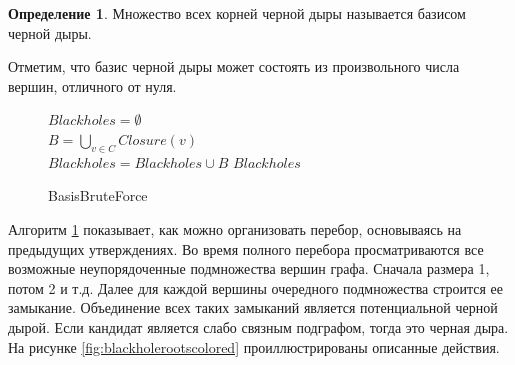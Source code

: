 \documentclass[12pt,a4paper,oneside,openany]{article}
\theoremstyle{definition}
\newtheorem{definition}{Определение}[]
\theoremstyle{lemma}
\theoremstyle{remark}
\begin{document}
\begin{definition}\label{def:blackholebasis}
Множество всех корней черной дыры называется базисом черной дыры.
\end{definition}

Отметим, что базис черной дыры может состоять из произвольного числа вершин, отличного от нуля.

\linespread{1.0}
\begin{figure}[H]
	\begin{center}
		\begin{algorithm}[H]
			\SetAlgoLined

                        $Blackholes = \emptyset$ \\
                         {
                             {
                                $B = \bigcup\limits_{v \in C} Closure(v)$ \\
                                 {
                                    $Blackholes = Blackholes \cup B$
                                }
                            }
                        }
                        \Return $Blackholes$
			\label{alg:basisbruteforce}
			\caption{BasisBruteForce}
		\end{algorithm}
	\end{center}
\end{figure}
\linespread{1.5}

Алгоритм \ref{alg:basisbruteforce} показывает, как можно организовать перебор, основываясь на предыдущих утверждениях.
Во время полного перебора просматриваются все возможные неупорядоченные подмножества вершин графа.
Сначала размера 1, потом 2 и т.д.
Далее для каждой вершины очередного подмножества строится ее замыкание.
Объединение всех таких замыканий является потенциальной черной дырой.
Если кандидат является слабо связным подграфом, тогда это черная дыра.
На рисунке \ref{fig:blackholerootscolored} проиллюстрированы описанные действия.
\end{document}
